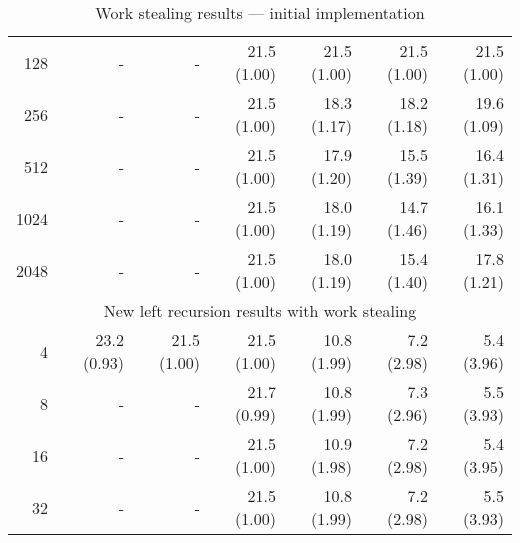 \begin{table}
\begin{center}
\begin{tabular}{r|rr|rrrr}
128  &-&-& 21.5 (1.00) & 21.5 (1.00) & 21.5 (1.00) & 21.5 (1.00) \\
256  &-&-& 21.5 (1.00) & 18.3 (1.17) & 18.2 (1.18) & 19.6 (1.09) \\
512  &-&-& 21.5 (1.00) & 17.9 (1.20) & 15.5 (1.39) & 16.4 (1.31) \\
1024 &-&-& 21.5 (1.00) & 18.0 (1.19) & 14.7 (1.46) & 16.1 (1.33) \\
2048 &-&-& 21.5 (1.00) & 18.0 (1.19) & 15.4 (1.40) & 17.8 (1.21) \\
\hline
\hline
\multicolumn{7}{c}{New left recursion results with work stealing} \\
\hline
4        & 23.2 (0.93) & 21.5 (1.00)
         & 21.5 (1.00) & 10.8 (1.99) &  7.2 (2.98) &  5.4 (3.96) \\
8    &-&-& 21.7 (0.99) & 10.8 (1.99) &  7.3 (2.96) &  5.5 (3.93) \\
16   &-&-& 21.5 (1.00) & 10.9 (1.98) &  7.2 (2.98) &  5.4 (3.95) \\
32   &-&-& 21.5 (1.00) & 10.8 (1.99) &  7.2 (2.98) &  5.5 (3.93) \\
\end{tabular}
\end{center}
\caption{Work stealing results --- initial implementation}
\label{tab:work_stealing_initial}
\end{table}

